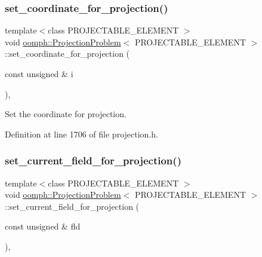 \subsubsection{\texorpdfstring{set\+\_\+coordinate\+\_\+for\+\_\+projection()}{set\_coordinate\_for\_projection()}}
{\footnotesize\ttfamily template$<$class P\+R\+O\+J\+E\+C\+T\+A\+B\+L\+E\+\_\+\+E\+L\+E\+M\+E\+NT $>$ \\
void \hyperlink{classoomph_1_1ProjectionProblem}{oomph\+::\+Projection\+Problem}$<$ P\+R\+O\+J\+E\+C\+T\+A\+B\+L\+E\+\_\+\+E\+L\+E\+M\+E\+NT $>$\+::set\+\_\+coordinate\+\_\+for\+\_\+projection (\begin{DoxyParamCaption}\item[{const unsigned \&}]{i }\end{DoxyParamCaption})\hspace{0.3cm}{\ttfamily [inline]}, {\ttfamily [private]}}



Set the coordinate for projection. 



Definition at line 1706 of file projection.\+h.

\mbox{\label{classoomph_1_1ProjectionProblem_a616f08ea08e8f1ba6be018e966f38830}} 
\subsubsection{\texorpdfstring{set\+\_\+current\+\_\+field\+\_\+for\+\_\+projection()}{set\_current\_field\_for\_projection()}}
{\footnotesize\ttfamily template$<$class P\+R\+O\+J\+E\+C\+T\+A\+B\+L\+E\+\_\+\+E\+L\+E\+M\+E\+NT $>$ \\
void \hyperlink{classoomph_1_1ProjectionProblem}{oomph\+::\+Projection\+Problem}$<$ P\+R\+O\+J\+E\+C\+T\+A\+B\+L\+E\+\_\+\+E\+L\+E\+M\+E\+NT $>$\+::set\+\_\+current\+\_\+field\+\_\+for\+\_\+projection (\begin{DoxyParamCaption}\item[{const unsigned \&}]{fld }\end{DoxyParamCaption})\hspace{0.3cm}{\ttfamily [inline]}, {\ttfamily [private]}}



